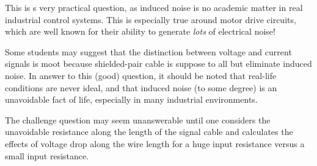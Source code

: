 





This is s very practical question, as induced noise is no academic matter in real industrial control systems.  This is especially true around motor drive circuits, which are well known for their ability to generate {\it lots} of electrical noise!

Some students may suggest that the distinction between voltage and current signals is moot because shielded-pair cable is suppose to all but eliminate induced noise.  In answer to this (good) question, it should be noted that real-life conditions are never ideal, and that induced noise (to some degree) is an unavoidable fact of life, especially in many industrial environments.

The challenge question may seem unanswerable until one considers the unavoidable resistance along the length of the signal cable and calculates the effects of voltage drop along the wire length for a huge input resistance versus a small input resistance.




